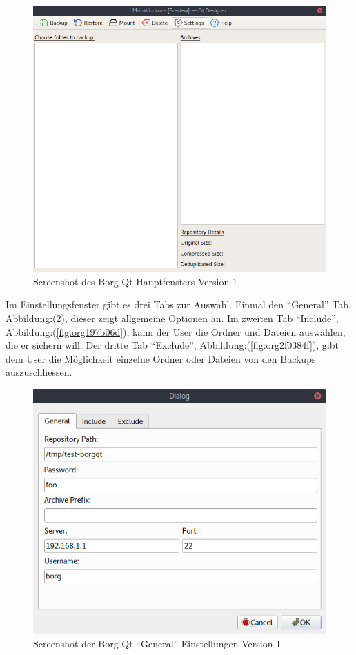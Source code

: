 \begin{figure}[H]
\centering
\includegraphics[width=.9\linewidth]{pictures/borgqt_main_v1.png}
\caption{\label{fig:org0896aa2}
Screenshot des Borg-Qt Hauptfensters Version 1}
\end{figure}

Im Einstellungsfenster gibt es drei Tabs zur Auswahl. Einmal den "`General"' Tab,
Abbildung:(\ref{fig:org90add12}), dieser zeigt allgemeine Optionen
an. Im zweiten Tab "`Include"', Abbildung:(\ref{fig:org197b06d}), kann
der User die Ordner und Dateien auswählen, die er sichern will. Der dritte Tab
"`Exclude"', Abbildung:(\ref{fig:org2f0384f}), gibt dem User die
Möglichkeit einzelne Ordner oder Dateien von den Backups auszuschliessen.

\begin{figure}[H]
\centering
\includegraphics[width=.7\textwidth]{pictures/borgqt_settings_general_v1.png}
\caption{\label{fig:org90add12}
Screenshot der Borg-Qt "`General"' Einstellungen Version 1}
\end{figure}

